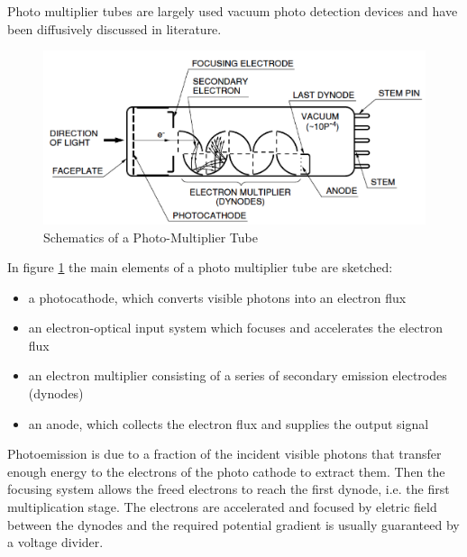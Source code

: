 Photo multiplier tubes are largely used vacuum photo detection devices and have been diffusively discussed in literature\cite{Knoll2000}. 
\begin{figure}[htbp]
\begin{center}
\includegraphics[width=12cm]{../Pictures/Chapter_3/PMT.png}
\end{center}
\caption[PMT schematics]{Schematics of a Photo-Multiplier Tube}
\label{fig:PMT_schematics}
\end{figure}
In figure \ref{fig:PMT_schematics} the main elements of a photo multiplier tube are sketched:
\begin{itemize}
\item a photocathode, which converts visible photons into an electron flux
\item an electron-optical input system which focuses and accelerates the electron flux
\item an electron multiplier consisting of a series of secondary emission electrodes (dynodes)
\item an anode, which collects the electron flux and supplies the output signal
\end{itemize}
Photoemission is due to a fraction of the incident visible photons that transfer enough energy to the electrons of the photo cathode to extract them.
Then the focusing system allows the freed electrons to reach the first dynode, i.e. the first multiplication stage. The electrons are accelerated and focused by eletric field between the dynodes and the required potential gradient is usually guaranteed by a voltage divider.


